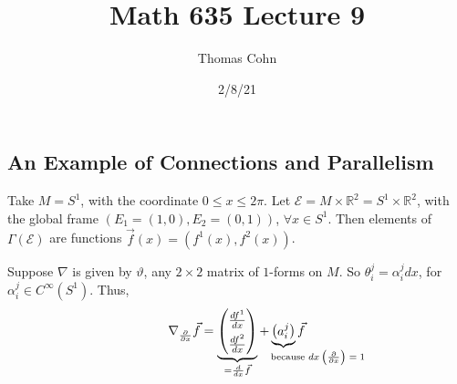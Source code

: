 \documentclass[10pt,letterpaper]{article}
\author{Thomas Cohn}
\title{Math 635 Lecture 9}
\date{2/8/21} %
\newcommand{\n}{\hfill\break}
\newcommand{\ptxt}[1]{\textrm{\textnormal{#1}}}
\newcommand{\reals}{\mathbb{R}}
\newcommand{\R}{\reals}
\newcommand{\pd}[2]{\frac{\partial{}#1}{\partial{}#2}}
\newcommand{\paren}[1]{\left(#1\right)}
\begin{document}
\maketitle
\setlength\RaggedRightParindent{\parindent}
\RaggedRight

\subsection*{An Example of Connections and Parallelism}

\par\noindent
Take $M=S^{1}$, with the coordinate $0\le{}x\le{}2\pi$. Let $\mathcal{E}=M\times\R^{2}=S^{1}\times\R^{2}$, with the global frame $(E_{1}=(1,0),E_{2}=(0,1))$, $\forall{}x\in{}S^{1}$. Then elements of $\Gamma(\mathcal{E})$ are functions $\vec{f}(x)=(f^{1}(x),f^{2}(x))$.\n

\par\noindent
Suppose $\nabla$ is given by $\vartheta$, any $2\times{}2$ matrix of $1$-forms on $M$. So $\theta_{i}^{j}=\alpha_{i}^{j}dx$, for $\alpha_{i}^{j}\in{}C^{\infty}(S^{1})$. Thus,
\[
	\nabla_{\pd{}{x}}\vec{f}=\underbrace{\begin{pmatrix}
			\frac{df^{1}}{dx}\\[5pt]
			\frac{df^{2}}{dx}
		\end{pmatrix}}_{=\frac{d}{dx}\vec{f}}+\underbrace{\begin{pmatrix}
		a_{i}^{j}
	\end{pmatrix}}_{\hspace{-20pt}\mathrlap{\ptxt{because $dx\paren{\pd{}{x}}=1$}}}\vec{f}
\]
\end{document}
